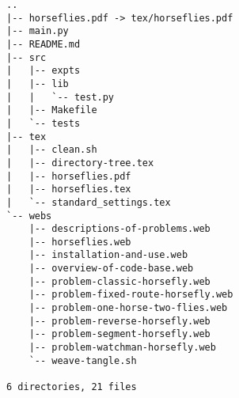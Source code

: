 \begin{verbatim}
..
|-- horseflies.pdf -> tex/horseflies.pdf
|-- main.py
|-- README.md
|-- src
|   |-- expts
|   |-- lib
|   |   `-- test.py
|   |-- Makefile
|   `-- tests
|-- tex
|   |-- clean.sh
|   |-- directory-tree.tex
|   |-- horseflies.pdf
|   |-- horseflies.tex
|   `-- standard_settings.tex
`-- webs
    |-- descriptions-of-problems.web
    |-- horseflies.web
    |-- installation-and-use.web
    |-- overview-of-code-base.web
    |-- problem-classic-horsefly.web
    |-- problem-fixed-route-horsefly.web
    |-- problem-one-horse-two-flies.web
    |-- problem-reverse-horsefly.web
    |-- problem-segment-horsefly.web
    |-- problem-watchman-horsefly.web
    `-- weave-tangle.sh

6 directories, 21 files
\end{verbatim}
